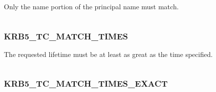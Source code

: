 \documentclass[letterpaper,10pt,english]{sphinxmanual}
\begin{document}
\begin{fulllineitems}
\label{appdev/refs/macros/KRB5_TC_MATCH_SRV_NAMEONLY:KRB5_TC_MATCH_SRV_NAMEONLY}
\end{fulllineitems}


Only the name portion of the principal name must match.

\begin{tabulary}{\linewidth}{|L|L|}
\hline

 & 
\\\hline
\end{tabulary}



\subsubsection{KRB5\_TC\_MATCH\_TIMES}
\label{appdev/refs/macros/KRB5_TC_MATCH_TIMES:krb5-tc-match-times}\label{appdev/refs/macros/KRB5_TC_MATCH_TIMES:krb5-tc-match-times-data}\label{appdev/refs/macros/KRB5_TC_MATCH_TIMES::doc}

\begin{fulllineitems}
\label{appdev/refs/macros/KRB5_TC_MATCH_TIMES:KRB5_TC_MATCH_TIMES}
\end{fulllineitems}


The requested lifetime must be at least as great as the time specified.

\begin{tabulary}{\linewidth}{|L|L|}
\hline

 & 
\\\hline
\end{tabulary}



\subsubsection{KRB5\_TC\_MATCH\_TIMES\_EXACT}
\label{appdev/refs/macros/KRB5_TC_MATCH_TIMES_EXACT:krb5-tc-match-times-exact-data}\label{appdev/refs/macros/KRB5_TC_MATCH_TIMES_EXACT::doc}\label{appdev/refs/macros/KRB5_TC_MATCH_TIMES_EXACT:krb5-tc-match-times-exact}

\begin{fulllineitems}
\label{appdev/refs/macros/KRB5_TC_MATCH_TIMES_EXACT:KRB5_TC_MATCH_TIMES_EXACT}
\end{fulllineitems}
\end{document}
